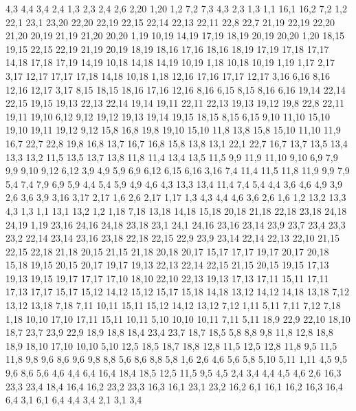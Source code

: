 4,3
4,4
3,4
2,4
%
1,3
2,3
2,4
2,6
2,20
1,20
%
1,2
7,2
7,3
4,3
2,3
1,3
%
1,1
16,1
16,2
7,2
1,2
22,1
23,1
23,20
22,20
22,19
22,15
22,14
22,13
22,11
22,8
22,7
%
21,19
22,19
22,20
21,20
%
20,19
21,19
21,20
20,20
%
1,19
10,19
14,19
17,19
18,19
20,19
20,20
1,20
%
18,15
19,15
22,15
22,19
21,19
20,19
18,19
18,16
%
17,16
18,16
18,19
17,19
17,18
17,17
%
14,18
17,18
17,19
14,19
%
10,18
14,18
14,19
10,19
%
1,18
10,18
10,19
1,19
%
1,17
2,17
3,17
12,17
17,17
17,18
14,18
10,18
1,18
%
12,16
17,16
17,17
12,17
%
3,16
6,16
8,16
12,16
12,17
3,17
%
8,15
18,15
18,16
17,16
12,16
8,16
%
6,15
8,15
8,16
6,16
%
19,14
22,14
22,15
19,15
%
19,13
22,13
22,14
19,14
%
19,11
22,11
22,13
19,13
19,12
%
19,8
22,8
22,11
19,11
19,10
%
6,12
9,12
19,12
19,13
19,14
19,15
18,15
8,15
6,15
%
9,10
11,10
15,10
19,10
19,11
19,12
9,12
%
15,8
16,8
19,8
19,10
15,10
%
11,8
13,8
15,8
15,10
11,10
11,9
%
16,7
22,7
22,8
19,8
16,8
%
13,7
16,7
16,8
15,8
13,8
%
13,1
22,1
22,7
16,7
13,7
13,5
13,4
13,3
13,2
%
11,5
13,5
13,7
13,8
11,8
%
11,4
13,4
13,5
11,5
%
9,9
11,9
11,10
9,10
%
6,9
7,9
9,9
9,10
9,12
6,12
%
3,9
4,9
5,9
6,9
6,12
6,15
6,16
3,16
%
7,4
11,4
11,5
11,8
11,9
9,9
7,9
%
5,4
7,4
7,9
6,9
5,9
%
4,4
5,4
5,9
4,9
4,6
%
4,3
13,3
13,4
11,4
7,4
5,4
4,4
%
3,6
4,6
4,9
3,9
%
2,6
3,6
3,9
3,16
3,17
2,17
%
1,6
2,6
2,17
1,17
%
1,3
4,3
4,4
4,6
3,6
2,6
1,6
%
1,2
13,2
13,3
4,3
1,3
%
1,1
13,1
13,2
1,2
1,18
7,18
13,18
14,18
15,18
20,18
21,18
22,18
23,18
24,18
24,19
1,19
%
23,16
24,16
24,18
23,18
%
23,1
24,1
24,16
23,16
23,14
23,9
23,7
23,4
23,3
23,2
%
22,14
23,14
23,16
23,18
22,18
22,15
%
22,9
23,9
23,14
22,14
22,13
22,10
%
21,15
22,15
22,18
21,18
%
20,15
21,15
21,18
20,18
20,17
%
15,17
17,17
19,17
20,17
20,18
15,18
%
19,15
20,15
20,17
19,17
%
19,13
22,13
22,14
22,15
21,15
20,15
19,15
%
17,13
19,13
19,15
19,17
17,17
%
17,10
18,10
22,10
22,13
19,13
17,13
17,11
%
15,11
17,11
17,13
17,17
15,17
15,12
%
14,12
15,12
15,17
15,18
14,18
%
13,12
14,12
14,18
13,18
%
7,12
13,12
13,18
7,18
%
7,11
10,11
15,11
15,12
14,12
13,12
7,12
%
1,11
5,11
7,11
7,12
7,18
1,18
%
10,10
17,10
17,11
15,11
10,11
%
5,10
10,10
10,11
7,11
5,11
%
18,9
22,9
22,10
18,10
%
18,7
23,7
23,9
22,9
18,9
18,8
%
18,4
23,4
23,7
18,7
18,5
%
5,8
8,8
9,8
11,8
12,8
18,8
18,9
18,10
17,10
10,10
5,10
%
12,5
18,5
18,7
18,8
12,8
%
11,5
12,5
12,8
11,8
%
9,5
11,5
11,8
9,8
9,6
%
8,6
9,6
9,8
8,8
%
5,6
8,6
8,8
5,8
%
1,6
2,6
4,6
5,6
5,8
5,10
5,11
1,11
%
4,5
9,5
9,6
8,6
5,6
4,6
%
4,4
6,4
16,4
18,4
18,5
12,5
11,5
9,5
4,5
%
2,4
3,4
4,4
4,5
4,6
2,6
%
16,3
23,3
23,4
18,4
16,4
%
16,2
23,2
23,3
16,3
%
16,1
23,1
23,2
16,2
%
6,1
16,1
16,2
16,3
16,4
6,4
%
3,1
6,1
6,4
4,4
3,4
%
2,1
3,1
3,4

